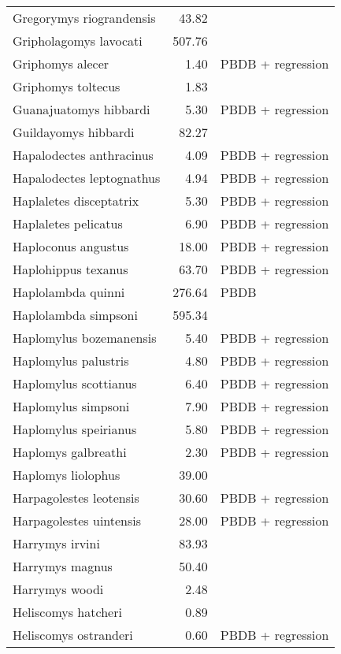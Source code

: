 \begin{table}[ht]
\begin{tabular}{lrl}
  Gregorymys riograndensis & 43.82 & \cite{Tomiya2013} \\ 
  Gripholagomys lavocati & 507.76 & \cite{Tomiya2013} \\ 
  Griphomys alecer & 1.40 & PBDB + regression \\ 
  Griphomys toltecus & 1.83 & \cite{Mihlbacher2006} \\ 
  Guanajuatomys hibbardi & 5.30 & PBDB + regression \\ 
  Guildayomys hibbardi & 82.27 & \cite{Tomiya2013} \\ 
  Hapalodectes anthracinus & 4.09 & PBDB + regression \\ 
  Hapalodectes leptognathus & 4.94 & PBDB + regression \\ 
  Haplaletes disceptatrix & 5.30 & PBDB + regression \\ 
  Haplaletes pelicatus & 6.90 & PBDB + regression \\ 
  Haploconus angustus & 18.00 & PBDB + regression \\ 
  Haplohippus texanus & 63.70 & PBDB + regression \\ 
  Haplolambda quinni & 276.64 & PBDB \\ 
  Haplolambda simpsoni & 595.34 & \cite{Tedford1994} \\ 
  Haplomylus bozemanensis & 5.40 & PBDB + regression \\ 
  Haplomylus palustris & 4.80 & PBDB + regression \\ 
  Haplomylus scottianus & 6.40 & PBDB + regression \\ 
  Haplomylus simpsoni & 7.90 & PBDB + regression \\ 
  Haplomylus speirianus & 5.80 & PBDB + regression \\ 
  Haplomys galbreathi & 2.30 & PBDB + regression \\ 
  Haplomys liolophus & 39.00 & \cite{McKenna2011} \\ 
  Harpagolestes leotensis & 30.60 & PBDB + regression \\ 
  Harpagolestes uintensis & 28.00 & PBDB + regression \\ 
  Harrymys irvini & 83.93 & \cite{Tomiya2013} \\ 
  Harrymys magnus & 50.40 & \cite{Tomiya2013} \\ 
  Harrymys woodi & 2.48 & \cite{Kirk2011} \\ 
  Heliscomys hatcheri & 0.89 & \cite{Wilson2012} \\ 
  Heliscomys ostranderi & 0.60 & PBDB + regression \\ 

\end{tabular}
\end{table}
